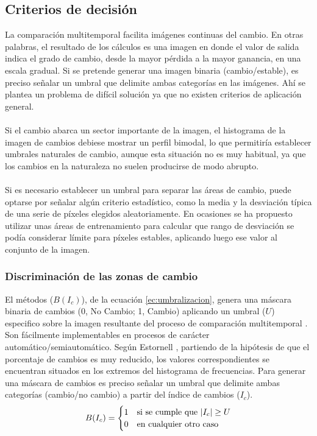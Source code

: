 \subsection{Criterios de decisi\'on}
La comparaci\'on multitemporal facilita im\'agenes continuas del cambio. En otras palabras, el resultado de los c\'alculos es una imagen en donde el valor de salida indica el grado de cambio, desde la mayor p\'erdida a la mayor ganancia, en una escala gradual. Si se pretende generar una imagen binaria (cambio/estable), es preciso se\~{n}alar un umbral que delimite ambas categor\'ias en las im\'agenes. Ah\'i se plantea un problema de dif\'icil soluci\'on ya que no existen criterios de aplicación general.\\~\\
Si el cambio abarca un sector importante de la imagen, el histograma de la imagen de cambios debiese mostrar un perfil bimodal, lo que permitir\'ia establecer umbrales naturales de cambio, aunque esta situaci\'on no es muy habitual, ya que los cambios en la naturaleza no suelen producirse de modo abrupto\cite{martinez2013normalizacion}.\\~\\
Si es necesario establecer un umbral para separar las \'areas de cambio, puede optarse por se\~{n}alar alg\'un criterio estad\'istico, como la media y la desviaci\'on t\'ipica de una serie de p\'ixeles elegidos aleatoriamente. En ocasiones se ha propuesto utilizar unas \'areas de entrenamiento para calcular que rango de desviaci\'on se pod\'ia considerar l\'imite para p\'ixeles estables, aplicando luego ese valor al conjunto de la imagen\cite{tung1988determination}.

\subsubsection{Discriminaci\'on de las zonas de cambio}\label{sec:discriminacion}
El m\'etodos ($ B(I_{c}) $), de la ecuaci\'on \ref{ec:umbralizacion}, genera una m\'ascara binaria de cambios (0, No Cambio; 1, Cambio) aplicando un umbral ($ U $) especifico sobre la imagen resultante del proceso de comparaci\'on multitemporal \cite{singh1989review}. Son f\'acilmente implementables en procesos de car\'acter autom\'atico/semiautom\'atico. Según Estornell \cite{estornell2004analisis}, partiendo de la hip\'otesis de que el porcentaje de cambios es muy reducido, los valores correspondientes se encuentran situados en los extremos del histograma de frecuencias. Para generar una m\'ascara de cambios es preciso se\~{n}alar un umbral que delimite ambas categorías (cambio/no cambio) a partir del \'indice de cambios ($ I_{c} $)\cite{radke2005image}.	
\begin{equation}\label{ec:umbralizacion}
B(I_{c}) = \begin{cases}
1 & \text{si se cumple que } \abs{I_c} \geq U \\
0 & \text{en cualquier otro caso}
\end{cases}
\end{equation}

